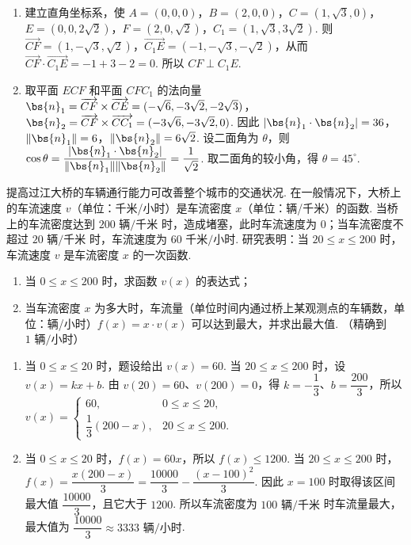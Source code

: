 \begin{solution}
\begin{enumerate}
\item 建立直角坐标系，使
\(A=(0,0,0)\)，\(B=(2,0,0)\)，\(C=(1,\sqrt{3},0)\)，\(E=(0,0,2\sqrt{2})\)，\(F=(2,0,\sqrt{2})\)，\(C_1=(1,\sqrt{3},3\sqrt{2})\). 则
\(\overrightarrow{CF}=(1,-\sqrt{3},\sqrt{2})\)，\(\overrightarrow{C_1E}=(-1,-\sqrt{3},-\sqrt{2})\)，从而
\(\overrightarrow{CF}\cdot\overrightarrow{C_1E}=-1+3-2=0\). 所以 \(CF\perp C_1E\).
\item 取平面 \(ECF\) 和平面 \(CFC_1\) 的法向量
\(\bs{n}_1=\overrightarrow{CF}\times\overrightarrow{CE}=(-\sqrt{6},-3\sqrt{2},-2\sqrt{3})\)，
\(\bs{n}_2=\overrightarrow{CF}\times\overrightarrow{CC_1}=(-3\sqrt{6},-3\sqrt{2},0)\). 因此
\(\lvert\bs{n}_1\cdot\bs{n}_2\rvert=36\)，\(\lVert\bs{n}_1\rVert=6\)，\(\lVert\bs{n}_2\rVert=6\sqrt{2}\). 设二面角为 \(\theta\)，则
\(\cos\theta=\dfrac{\lvert\bs{n}_1\cdot\bs{n}_2\rvert}{\lVert\bs{n}_1\rVert\lVert\bs{n}_2\rVert}=\dfrac1{\sqrt{2}}\). 取二面角的较小角，得 \(\theta=45^{\circ}\).
\end{enumerate}
\end{solution}

\begin{problem}
提高过江大桥的车辆通行能力可改善整个城市的交通状况. 在一般情况下，大桥上的车流速度 \(v\)（单位：千米/小时）是车流密度 \(x\)（单位：辆/千米）的函数. 当桥上的车流密度达到 \(200\text{ 辆/千米}\) 时，造成堵塞，此时车流速度为 \(0\)；当车流密度不超过 \(20\text{ 辆/千米}\) 时，车流速度为 \(60\text{ 千米/小时}\). 研究表明：当 \(20 \leqslant x \leqslant 200\) 时，车流速度 \(v\) 是车流密度 \(x\) 的一次函数.
\begin{enumerate}
\item 当 \(0 \leqslant x \leqslant 200\) 时，求函数 \(v(x)\) 的表达式；
\item 当车流密度 \(x\) 为多大时，车流量（单位时间内通过桥上某观测点的车辆数，单位：辆/小时）\(f(x) = x \cdot v(x)\) 可以达到最大，并求出最大值. （精确到 \(1\text{ 辆/小时}\)）
\end{enumerate}
\end{problem}

\begin{solution}
\begin{enumerate}
\item 当 \(0\leqslant x\leqslant20\) 时，题设给出 \(v(x)=60\). 当 \(20\leqslant x\leqslant200\) 时，设 \(v(x)=kx+b\). 由 \(v(20)=60\)、\(v(200)=0\)，得 \(k=-\dfrac13\)、\(b=\dfrac{200}{3}\)，所以
\(v(x)=\begin{cases}
60,&0\leqslant x\leqslant20,\\
\dfrac13(200-x),&20\leqslant x\leqslant200.
\end{cases}\)
\item 当 \(0\leqslant x\leqslant20\) 时，\(f(x)=60x\)，所以 \(f(x)\leqslant1200\). 当 \(20\leqslant x\leqslant200\) 时，
\(f(x)=\dfrac{x(200-x)}3=\dfrac{10000}{3}-\dfrac{(x-100)^2}{3}\). 因此 \(x=100\) 时取得该区间最大值 \(\dfrac{10000}{3}\)，且它大于 \(1200\). 所以车流密度为 \(100\text{ 辆/千米}\) 时车流量最大，最大值为 \(\dfrac{10000}{3}\approx3333\text{ 辆/小时}\).
\end{enumerate}
\end{solution}


